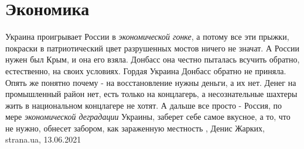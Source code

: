  
 
 
 
 
\chapter{Экономика}
\label{sec:slova.ekonomika}

Украина проигрывает России в \emph{экономической гонке}, а потому все эти прыжки,
покраски в патриотический цвет разрушенных мостов ничего не значат. А России
нужен был Крым, и она его взяла. Донбасс она честно пыталась всучить обратно,
естественно, на своих условиях. Гордая Украина Донбасс обратно не приняла.
Опять же понятно почему - на восстановление нужны деньги, а их нет. Денег на
промышленный район нет, есть только на концлагерь, а несознательные шахтеры
жить в национальном концлагере не хотят.  А дальше все просто - Россия, по мере
\emph{экономической деградации} Украины, заберет себе самое вкусное, а то, что не
нужно, обнесет забором, как зараженную местность
, 
Денис Жарких, strana.ua, 13.06.2021

